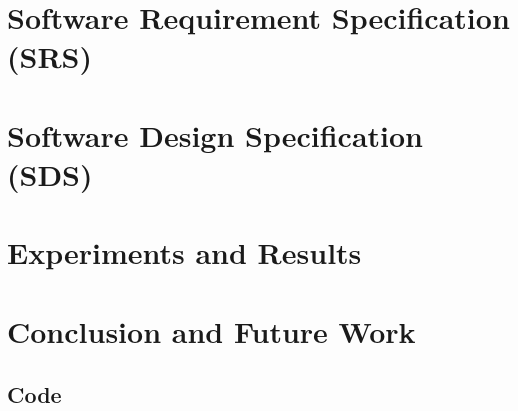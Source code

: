 \documentclass[12pt]{report}
\begin{document}
\chapter{Software Requirement Specification (SRS)}
\label{chap:srs}


\chapter{Software Design Specification (SDS)}
\label{chap:sds}


\chapter{Experiments and Results}
\label{chap:results}


\chapter{Conclusion and Future Work}
\label{chap:outro}


\begin{appendices}



\chapter{Code}

\end{appendices}

\printbibliography[heading=bibintoc,title={References}]
\end{document}
